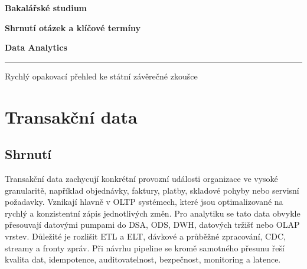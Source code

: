 \documentclass[12pt,a4paper]{article}
\begin{document}
\begin{titlepage}
  \centering
  \vspace*{2.4cm}
  {\Large\bfseries Bakalářské studium\par}
  \vspace{1.2cm}
  {\Huge\bfseries Shrnutí otázek a klíčové termíny\par}
  \vspace{0.6cm}
  {\LARGE\bfseries Data Analytics\par}
  \vspace{0.8cm}
  \rule{0.72\textwidth}{0.4pt}\par
  \vspace{0.8cm}
  {\large Rychlý opakovací přehled ke státní závěrečné zkoušce\par}
  \vfill
\end{titlepage}

\tableofcontents
\newpage

\section{Transakční data}

\subsection{Shrnutí}
Transakční data zachycují konkrétní provozní události organizace ve vysoké granularitě, například
objednávky, faktury, platby, skladové pohyby nebo servisní požadavky. Vznikají hlavně v OLTP
systémech, které jsou optimalizované na rychlý a konzistentní zápis jednotlivých změn. Pro analytiku
se tato data obvykle přesouvají datovými pumpami do DSA, ODS, DWH, datových tržišť nebo OLAP vrstev.
Důležité je rozlišit ETL a ELT, dávkové a průběžné zpracování, CDC, streamy a fronty zpráv. Při
návrhu pipeline se kromě samotného přesunu řeší kvalita dat, idempotence, auditovatelnost,
bezpečnost, monitoring a latence.
\end{document}
